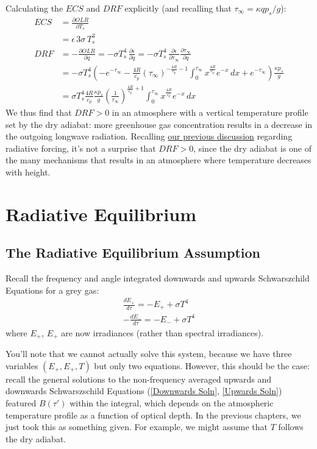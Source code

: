 Calculating the $ECS$ and $DRF$ explicitly (and recalling that $\tau_\infty=\kappa q p_s/g$):
\begin{align*}
    ECS &=\frac{\partial OLR}{\partial T_s}\\
    &=\epsilon\, 3\sigma\, T_s^3
    \\
    DRF &= -\frac{\partial OLR}{\partial q}=-\sigma T_s^4 \,\frac{\partial \epsilon}{\partial q} 
    =-\sigma T_s^4 \,\frac{\partial \epsilon}{\partial \tau_\infty} \frac{\partial \tau_\infty}{\partial q}
    \\
    &= -\sigma T_s^4 \left( -e^{-\tau_\infty} - 
    \frac{4R}{c_p}
    \left( \tau_\infty \right)^{-\frac{4R}{c_p}-1}
    \int_0^{\tau_\infty}
    x^{\frac{4R}{c_p}}
    e^{-x}
    \,dx
    +
    e^{-\tau_\infty}
    \right)
    \frac{\kappa p_s}{g}
    \\
    &=\sigma T_s^4 \frac{4R}{c_p}\frac{\kappa p_s}{g} \left( \frac{1}{\tau_\infty} \right)^{\frac{4R}{c_p}+1}
    \int_0^{\tau_\infty}
    x^{\frac{4R}{c_p}}
    e^{-x}
    \,dx
\end{align*}
We thus find that $DRF>0$ in an atmosphere with a vertical temperature profile set by the dry adiabat: more greenhouse gas concentration results in a decrease in the outgoing longwave radiation. Recalling \hyperref[RF Box Takeaway]{our previous discussion} regarding radiative forcing, it's not a surprise that $DRF>0$, since the dry adiabat is one of the many mechanisms that results in an atmosphere where temperature decreases with height.

\chapter{Radiative Equilibrium}

\section{The Radiative Equilibrium Assumption}

Recall the frequency and angle integrated downwards and upwards Schwarszchild Equations for a grey gas:
\begin{align*}
    \frac{dE_+}{d\tau}=-E_++\sigma T^4 \\
    -\frac{dE_-}{d\tau}=-E_-+\sigma T^4
\end{align*}
where $E_+$, $E_+$ are now irradiances (rather than spectral irradiances).

You'll note that we cannot actually solve this system, because we have three variables $(E_+,E_+,T)$ but only two equations. However, this should be the case: recall the general solutions to the non-frequency averaged upwards and downwards Schwarszschild Equations (\ref{Downwards Soln}, \ref{Upwards Soln}) featured $B(\tau')$ within the integral, which depends on the atmospheric temperature profile as a function of optical depth. In the previous chapters, we just took this as something given. For example, we might assume that $T$ follows the dry adiabat.

